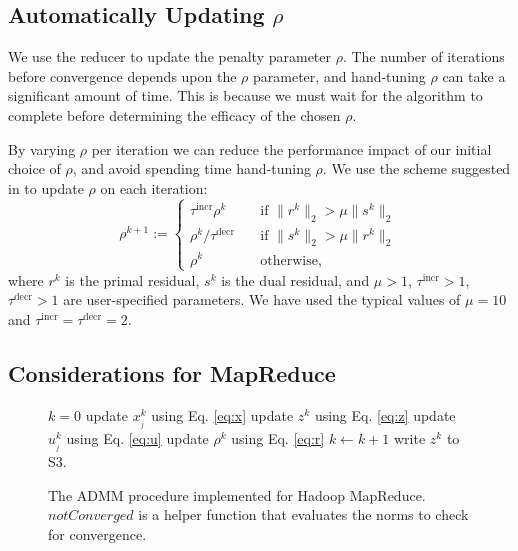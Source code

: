 \documentclass[10pt, conference, compsocconf]{IEEEtran}
\begin{document}
\subsection{Automatically Updating $\rho$}

We use the reducer to update the penalty parameter $\rho$.  The number of iterations before convergence depends upon the $\rho$ parameter, and hand-tuning $\rho$ can take a significant amount of time.  This is because we must wait for the algorithm to complete before determining the efficacy of the chosen $\rho$.

By varying $\rho$ per iteration we can reduce the performance impact of our initial choice of $\rho$, and avoid spending time hand-tuning $\rho$.  We use the scheme suggested in \cite{boyd} to update $\rho$ on each iteration:
\begin{equation}
\rho^{k+1}:=\begin{cases}
  \tau^{\text{incr}}\rho^k&\quad \text{if $\|r^k\|_2>\mu\|s^k\|_2$}\\
  \rho^k/\tau^{\text{decr}}&\quad \text{if $\|s^k\|_2>\mu\|r^k\|_2$}\\
  \rho^k&\quad \text{otherwise,}
\end{cases}
\label{eq:r}
\end{equation}
where $r^k$ is the primal residual, $s^k$ is the dual residual, and $\mu>1$, $\tau^{\text{incr}}>1$, $\tau^{\text{decr}}>1$ are user-specified parameters.  We have used the typical values of $\mu=10$ and $\tau^{\text{incr}}=\tau^{\text{decr}}=2$.

\subsection{Considerations for MapReduce}
\begin{figure}
\begin{algorithmic}[1]
  \State $k=0$
  \label{alg:while}
    \label{alg:startInner}
      \State update $x_{_j}^k$ using Eq. \ref{eq:x}
    \EndFor
    \State update $z^k$ using Eq. \ref{eq:z}
       \State update $u_{_j}^k$ using Eq. \ref{eq:u}
    \EndFor
    \State update $\rho^k$ using Eq. \ref{eq:r}
    \State $k \gets k + 1$\label{alg:endInner}
  \EndWhile
  \State write $z^k$ to S3.\label{alg:output}
\EndProcedure
\end{algorithmic}
\caption{The ADMM procedure implemented for Hadoop MapReduce.  $notConverged$ is a helper function that evaluates the norms to check for convergence.}
\label{alg:admm}
\end{figure}
\end{document}
